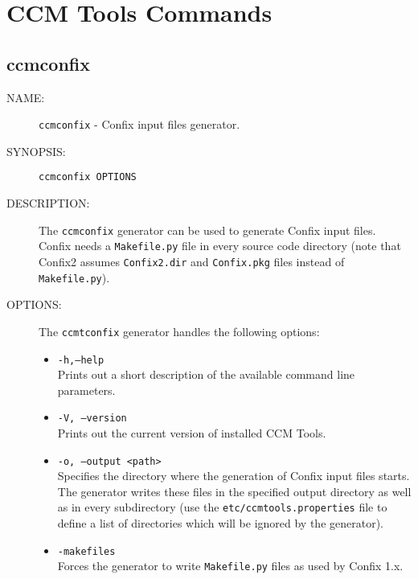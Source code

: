 
\chapter{CCM Tools Commands}

\section{ccmconfix}
\begin{description}
\item [NAME:] 
  {\tt ccmconfix} - Confix input files generator.

\item [SYNOPSIS:] 
  {\tt ccmconfix OPTIONS}

\item [DESCRIPTION:]
The {\tt ccmconfix} generator can be used to generate Confix input files.
Confix needs a {\tt Makefile.py} file in every source code directory (note that
Confix2 assumes {\tt Confix2.dir} and {\tt Confix.pkg} files instead of {\tt Makefile.py}).

\item [OPTIONS:]
  The {\tt ccmtconfix} generator handles the following options:
  \begin{itemize}
  \item {\tt -h,--help} \\
    Prints out a short description of the available command line parameters.

  \item {\tt -V, --version} \\
    Prints out the current version of installed CCM Tools.

  \item {\tt -o, --output <path> } \\
    Specifies the directory where the generation of Confix input files starts.
    The generator writes these files in the specified output directory as well
    as in every subdirectory (use the {\tt etc/ccmtools.properties} file to
    define a list of directories which will be ignored by the generator).

  \item {\tt -makefiles} \\
    Forces the generator to write {\tt Makefile.py} files as used by Confix 1.x.


\end{itemize}
\end{description}
